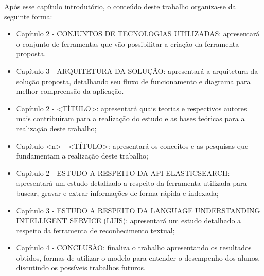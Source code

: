 Após esse capítulo introdutório, o conteúdo deste trabalho organiza-se da seguinte forma:
	\begin{itemize}
		\item{Capítulo 2 - \uppercase{Conjuntos de tecnologias utilizadas}: apresentará o conjunto de ferramentas que vão possibilitar a criação da ferramenta proposta.}
		\item{Capítulo 3 - \uppercase{Arquitetura da solução}: apresentará a arquitetura da solução proposta, detalhando seu fluxo de funcionamento e diagrama para melhor compreensão da aplicação.}

		\item{Capítulo 2 - \uppercase{<Título>}: apresentará quais teorias e respectivos autores mais contribuíram para a realização do estudo e as bases teóricas para a realização deste trabalho;}
		\item{Capítulo <n> - \uppercase{<Título>}: apresentará os conceitos e as pesquisas que fundamentam a realização deste trabalho;}
		\item{Capítulo 2 - \uppercase{Estudo a respeito da API Elasticsearch}: apresentará um estudo detalhado a respeito da ferramenta utilizada para buscar, gravar e extrar informações de forma rápida e indexada;}
		\item{Capítulo 3 - \uppercase{Estudo a respeito da Language Understanding Intelligent Service (LUIS)}: apresentará um estudo detalhado a respeito da ferramenta de reconhecimento textual;}
		\item{Capítulo 4 - CONCLUSÃO: finaliza o trabalho apresentando os resultados obtidos, formas de utilizar o modelo para entender o desempenho dos alunos, discutindo os possíveis trabalhos futuros.}
	\end{itemize}
